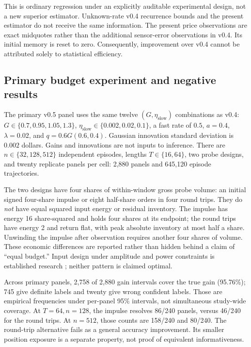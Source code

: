\documentclass[11pt,a4paper]{article}
\theoremstyle{definition}
\theoremstyle{remark}
\begin{document}
This is ordinary regression under an explicitly auditable experimental design, not a new superior estimator. Unknown-rate v0.4 recurrence bounds and the present estimator do not receive the same information. The present price observations are exact midquotes rather than the additional sensor-error observations in v0.4. Its initial memory is reset to zero. Consequently, improvement over v0.4 cannot be attributed solely to statistical efficiency.

\subsection{Primary budget experiment and negative results}
The primary v0.5 panel uses the same twelve $(G,\eta_{\mathrm{slow}})$ combinations as v0.4: $G\in\{0.7,0.95,1.05,1.3\}$, $\eta_{\mathrm{slow}}\in\{0.002,0.02,0.1\}$, a fast rate of $0.5$, $a=0.4$, $\lambda=0.02$, and $q=0.6G(0.6,0.4)$. Gaussian innovation standard deviation is $0.002$ dollars. Gains and innovations are not inputs to inference. There are $n\in\{32,128,512\}$ independent episodes, lengths $T\in\{16,64\}$, two probe designs, and twenty replicate panels per cell: 2,880 panels and 645,120 episode trajectories.

The two designs have four shares of within-window gross probe volume: an initial signed four-share impulse or eight half-share orders in four round trips. They do \emph{not} have equal squared input energy or residual inventory. The impulse has energy 16 share-squared and holds four shares at its endpoint; the round trips have energy 2 and return flat, with peak absolute inventory at most half a share. Unwinding the impulse after observation requires another four shares of volume. These economic differences are reported rather than hidden behind a claim of ``equal budget.'' Input design under amplitude and power constraints is established research \citep{manchester2010}; neither pattern is claimed optimal.

Across primary panels, 2,758 of 2,880 gain intervals cover the true gain (95.76\%); 745 give definite labels and twenty give wrong confident labels. Those are empirical frequencies under per-panel 95\% intervals, not simultaneous study-wide coverage. At $T=64,n=128$, the impulse resolves 86/240 panels, versus 46/240 for the round trips. At $n=512$, those counts are 158/240 and 80/240. The round-trip alternative fails as a general accuracy improvement. Its smaller position exposure is a separate property, not proof of equivalent informativeness.
\end{document}
